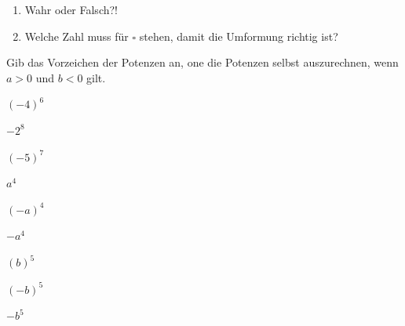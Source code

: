 \documentclass[11pt,oneside]{article}
\begin{document}
\begin{aufgabe}
\begin{enumerate}
            \item Wahr oder Falsch?!
            \item Welche Zahl muss für $\square$ stehen, damit die Umformung richtig ist?
        \end{enumerate}
    \end{aufgabe}
    \begin{aufgabe}
    	Gib das Vorzeichen der Potenzen an, one die Potenzen selbst auszurechnen, wenn $a>0$ und $b<0$ gilt.
    	\begin{enumcols}[3]
    		\item $(-4)^{6}$
    		\item $-2^{8}$
    		\item $(-5)^{7}$
    		\item $a^{4}$
    		\item $(-a)^{4}$
    		\item $-a^{4}$
    		\item $(b)^{5}$
    		\item $(-b)^{5}$
    		\item $-b^{5}$
    	\end{enumcols}
    \end{aufgabe}
\end{document}
